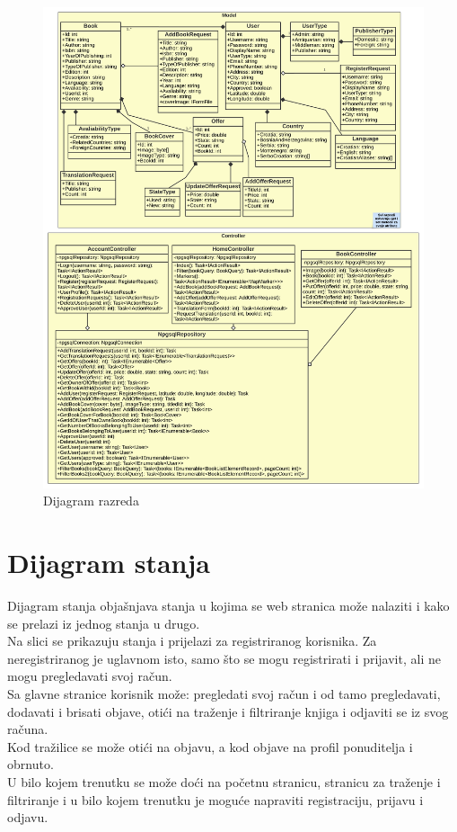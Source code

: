 			\begin{figure}[h]
				\centering
				\includegraphics[width = \textwidth]{slike/dijagramKlasa.PNG}
				\caption{Dijagram razreda}
				\label{fig:enter-label}
			\end{figure}
			
			\clearpage
		
		\section{Dijagram stanja}
			
			
			Dijagram stanja objašnjava stanja u kojima se web stranica može nalaziti i kako se prelazi iz jednog stanja u drugo.\\
			Na slici se prikazuju stanja i prijelazi za registriranog korisnika. Za neregistriranog je uglavnom isto, samo što se mogu registrirati i prijavit, ali  ne mogu pregledavati svoj račun.\\
			Sa glavne stranice korisnik može: pregledati svoj račun i od tamo pregledavati, dodavati i brisati objave, otići na traženje i filtriranje knjiga i odjaviti se iz svog računa.\\
			Kod tražilice se može otići na objavu, a kod objave na profil ponuditelja i obrnuto. \\
			U bilo kojem trenutku se može doći na početnu stranicu, stranicu za traženje i filtriranje i u bilo kojem trenutku je moguće napraviti registraciju, prijavu i odjavu.

